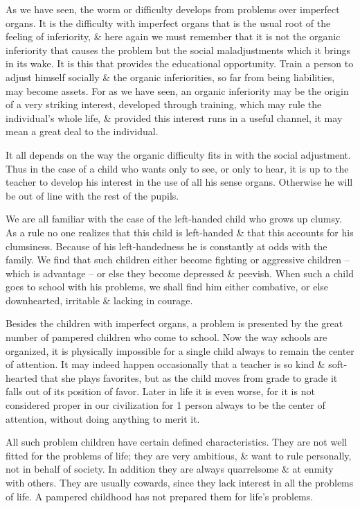 \documentclass{article}
\numberwithin{equation}{section}
\begin{document}
As we have seen, the worm or difficulty develops from problems over imperfect organs. It is the difficulty with imperfect organs that is the usual root of the feeling of inferiority, \& here again we must remember that it is not the organic inferiority that causes the problem but the social maladjustments which it brings in its wake. It is this that provides the educational opportunity. Train a person to adjust himself socially \& the organic inferiorities, so far from being liabilities, may become assets. For as we have seen, an organic inferiority may be the origin of a very striking interest, developed through training, which may rule the individual's whole life, \& provided this interest runs in a useful channel, it may mean a great deal to the individual.

It all depends on the way the organic difficulty fits in with the social adjustment. Thus in the case of a child who wants only to see, or only to hear, it is up to the teacher to develop his interest in the use of all his sense organs. Otherwise he will be out of line with the rest of the pupils.

We are all familiar with the case of the left-handed child who grows up clumsy. As a rule no one realizes that this child is left-handed \& that this accounts for his clumsiness. Because of his left-handedness he is constantly at odds with the family. We find that such children either become fighting or aggressive children -- which is advantage -- or else they become depressed \& peevish. When such a child goes to school with his problems, we shall find him either combative, or else downhearted, irritable \& lacking in courage.

Besides the children with imperfect organs, a problem is presented by the great number of pampered children who come to school. Now the way schools are organized, it is physically impossible for a single child always to remain the center of attention. It may indeed happen occasionally that a teacher is so kind \& soft-hearted that she plays favorites, but as the child moves from grade to grade it falls out of its position of favor. Later in life it is even worse, for it is not considered proper in our civilization for 1 person always to be the center of attention, without doing anything to merit it.

All such problem children have certain defined characteristics. They are not well fitted for the problems of life; they are very ambitious, \& want to rule personally, not in behalf of society. In addition they are always quarrelsome \& at enmity with others. They are usually cowards, since they lack interest in all the problems of life. A pampered childhood has not prepared them for life's problems.
\end{document}
